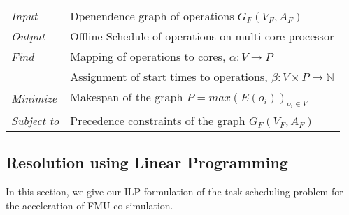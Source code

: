 \begin{table}[h]
\centering
\begin{tabular}{l  l}
  \rule{0pt}{5ex}	
	\textit{Input} & Dpenendence graph of operations $G_F(V_F,A_F)$\\
	\rule{0pt}{5ex}									  
	
  \textit{Output} & Offline Schedule of operations on multi-core processor\\
	\rule{0pt}{5ex}									  
  
	\textit{Find} & Mapping of operations to cores, $\alpha: V \rightarrow P$\\
	\rule{0pt}{5ex}
                & Assignment of start times to operations, $\beta: V \times P \rightarrow \mathbb{N}$\\
	\rule{0pt}{5ex}
	
	\textit{Minimize} & Makespan of the graph $P = max(E(o_i))_{o_i \in V}$\\
	\rule{0pt}{5ex}									 
	
	\textit{Subject to} & Precedence constraints of the graph $G_F(V_F,A_F)$\\
										 
	
\end{tabular}
\end{table}

\subsection{Resolution using Linear Programming}

In this section, we give our ILP formulation of the task scheduling problem for the acceleration of FMU co-simulation.

